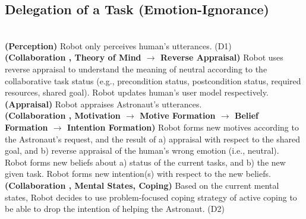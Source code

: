 \subsection{Delegation of a Task (Emotion-Ignorance)}
\label{sec:wt-exp4}

\noindent{}\\

\noindent\textbf{(Perception)} Robot only perceives human's utterances. (D1)\\

\noindent\textbf{(Collaboration , Theory of Mind $\rightarrow$ Reverse
Appraisal)} Robot uses reverse appraisal to understand the meaning of neutral
according to the collaborative task status (e.g., precondition status,
postcondition status, required resources, shared goal). Robot updates human's
user model respectively.\\

\noindent\textbf{(Appraisal)} Robot appraises Astronaut's utterances.\\

\noindent\textbf{(Collaboration , Motivation $\rightarrow$ Motive Formation
$\rightarrow$ Belief Formation $\rightarrow$ Intention Formation)} Robot forms
new motives according to the Astronaut's request, and the result of a) appraisal
with respect to the shared goal, and b) reverse appraisal of the human's wrong
emotion (i.e., neutral). Robot forms new beliefs about a) status of the current
tasks, and b) the new given task. Robot forms new intention(s) with respect to
the new beliefs.\\

\noindent\textbf{(Collaboration , Mental States, Coping)} Based on the current
mental states, Robot decides to use problem-focused coping strategy of active
coping to be able to drop the intention of helping the Astronaut. (D2)\\

\noindent{}\\

\noindent{}\\

